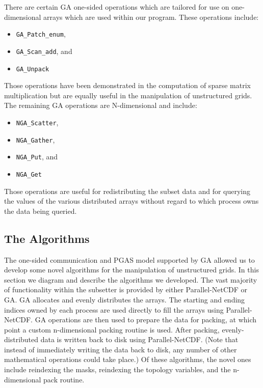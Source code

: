 There are certain GA one-sided operations which are tailored for use on
one-dimensional arrays which are used within our program.  These operations
include:

\begin{itemize}
\item \verb=GA_Patch_enum=,
\item \verb=GA_Scan_add=, and
\item \verb=GA_Unpack=
\end{itemize}

Those operations have been demonstrated in the computation of sparse matrix
multiplication\cite{GA} but are equally useful in the manipulation of
unstructured grids.  The remaining GA operations are N-dimensional and
include:

\begin{itemize}
\item \verb=NGA_Scatter=,
\item \verb=NGA_Gather=,
\item \verb=NGA_Put=, and
\item \verb=NGA_Get=
\end{itemize}

Those operations are useful for redistributing the subset data and for
querying the values of the various distributed arrays without regard to which
process owns the data being queried.

\subsection{The Algorithms}

The one-sided communication and PGAS model supported by GA allowed us to
develop some novel algorithms for the manipulation of unstructured grids.  In
this section we diagram and describe the algorithms we developed.  The vast
majority of functionality within the subsetter is provided by either
Parallel-NetCDF or GA.  GA allocates and evenly distributes the arrays.  The
starting and ending indices owned by each process are used directly to fill
the arrays using Parallel-NetCDF.  GA operations are then used to prepare the
data for packing, at which point a custom n-dimensional packing routine is
used.  After packing, evenly-distributed data is written back to disk using
Parallel-NetCDF.  (Note that instead of immediately writing the data back to
disk, any number of other mathematical operations could take place.) Of these
algorithms, the novel ones include reindexing the masks, reindexing the
topology variables, and the n-dimensional pack routine.

